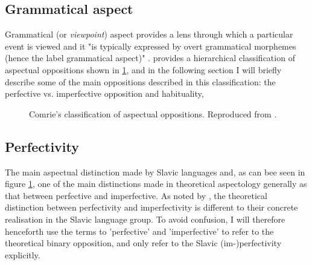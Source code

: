 \subsection*{\citet{moens-steedman-1988-temporal}}

\subsection{Grammatical aspect}
Grammatical (or \emph{viewpoint}) aspect provides a lens through which a particular event is viewed and it "is typically expressed by overt grammatical morphemes (hence the label grammatical aspect)" \citep{Chapter1IntroductionCrossLinguisticPerspectivesontheSemanticsofGrammaticalAspect}. \citet{comrie1976aspect} provides a hierarchical classification of aspectual oppositions shown in \ref{fig:comrieaspecttree}, and in the following section I will briefly describe some of the main oppositions described in this classification: the perfective vs. imperfective opposition and habituality, 

\begin{figure}
    \centering
    \caption{Comrie's classification of aspectual oppositions. Reproduced from \citet{comrie1976aspect}.}
    \label{fig:comrieaspecttree}
\end{figure}

\subsection*{Perfectivity}
\label{sec:perfectivity}
The main aspectual distinction made by Slavic languages and, as can bee seen in figure \ref{fig:comrieaspecttree}, one of the main distinctions made in theoretical aspectology generally as that between perfective and imperfective. As noted by \citet{Dahl1985TenseAA}, the theoretical distinction between perfectivity and imperfectivity is different to their concrete realisation in the Slavic language group. To avoid confusion, I will therefore henceforth use the terms to 'perfective' and 'imperfective' to refer to the theoretical binary opposition, and only refer to the Slavic (im-)perfectivity explicitly.

